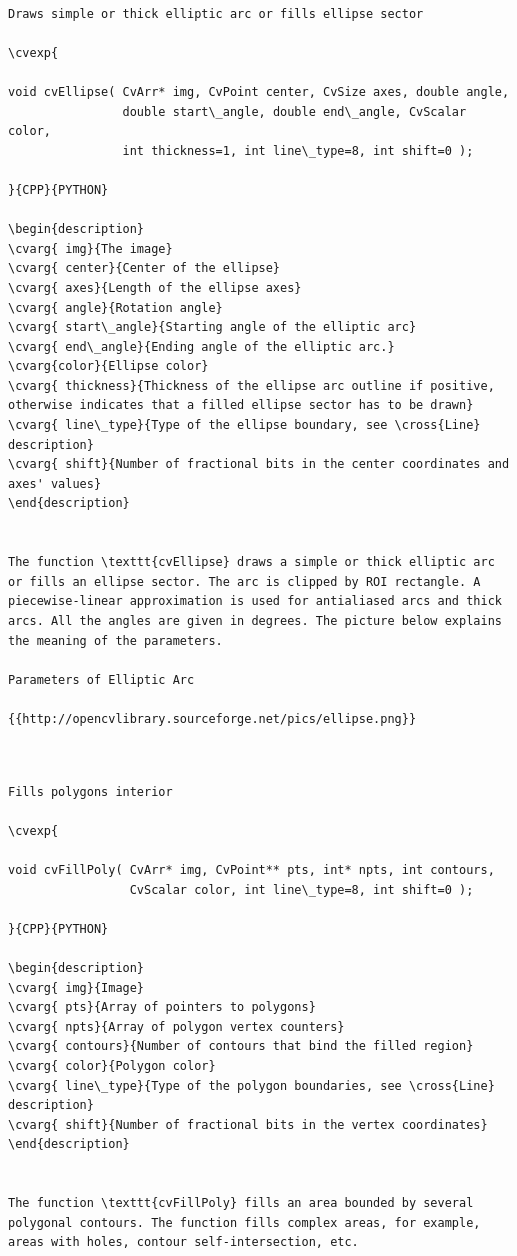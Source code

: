 \label{Ellipse}
\begin{verbatim}

Draws simple or thick elliptic arc or fills ellipse sector

\cvexp{

void cvEllipse( CvArr* img, CvPoint center, CvSize axes, double angle,
                double start\_angle, double end\_angle, CvScalar color,
                int thickness=1, int line\_type=8, int shift=0 );

}{CPP}{PYTHON}

\begin{description}
\cvarg{ img}{The image}
\cvarg{ center}{Center of the ellipse}
\cvarg{ axes}{Length of the ellipse axes}
\cvarg{ angle}{Rotation angle}
\cvarg{ start\_angle}{Starting angle of the elliptic arc}
\cvarg{ end\_angle}{Ending angle of the elliptic arc.}
\cvarg{color}{Ellipse color}
\cvarg{ thickness}{Thickness of the ellipse arc outline if positive, otherwise indicates that a filled ellipse sector has to be drawn}
\cvarg{ line\_type}{Type of the ellipse boundary, see \cross{Line} description}
\cvarg{ shift}{Number of fractional bits in the center coordinates and axes' values}
\end{description}


The function \texttt{cvEllipse} draws a simple or thick elliptic arc or fills an ellipse sector. The arc is clipped by ROI rectangle. A piecewise-linear approximation is used for antialiased arcs and thick arcs. All the angles are given in degrees. The picture below explains the meaning of the parameters.

Parameters of Elliptic Arc

{{http://opencvlibrary.sourceforge.net/pics/ellipse.png}}


\end{verbatim}
\label{FillPoly}
\begin{verbatim}

Fills polygons interior

\cvexp{

void cvFillPoly( CvArr* img, CvPoint** pts, int* npts, int contours,
                 CvScalar color, int line\_type=8, int shift=0 );

}{CPP}{PYTHON}

\begin{description}
\cvarg{ img}{Image}
\cvarg{ pts}{Array of pointers to polygons}
\cvarg{ npts}{Array of polygon vertex counters}
\cvarg{ contours}{Number of contours that bind the filled region}
\cvarg{ color}{Polygon color}
\cvarg{ line\_type}{Type of the polygon boundaries, see \cross{Line} description}
\cvarg{ shift}{Number of fractional bits in the vertex coordinates}
\end{description}


The function \texttt{cvFillPoly} fills an area bounded by several polygonal contours. The function fills complex areas, for example, areas with holes, contour self-intersection, etc.


\end{verbatim}
